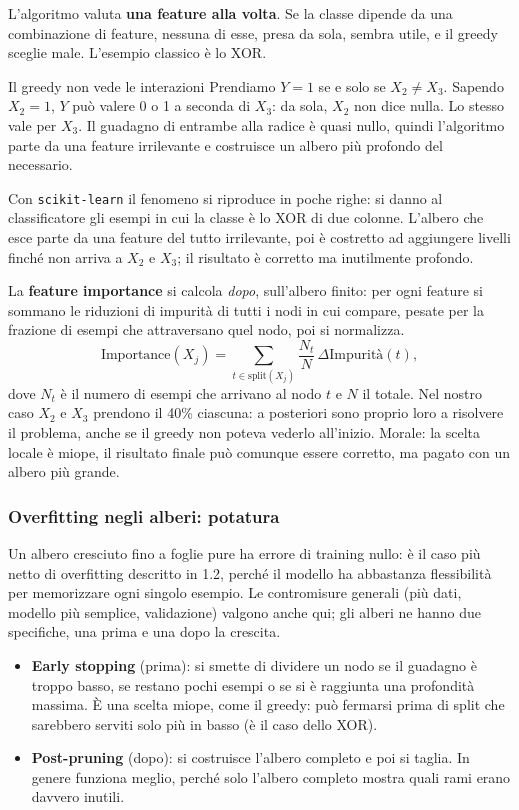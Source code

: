 \documentclass[12pt]{extarticle}
\begin{document}
\noindent L'algoritmo valuta \textbf{una feature alla volta}. Se la classe dipende da una combinazione di feature, nessuna di esse, presa da sola, sembra utile, e il greedy sceglie male. L'esempio classico è lo XOR.

\begin{attenzionebox}{Il greedy non vede le interazioni}
Prendiamo $Y = 1$ se e solo se $X_2 \neq X_3$. Sapendo $X_2=1$, $Y$ può valere 0 o 1 a seconda di $X_3$: da sola, $X_2$ non dice nulla. Lo stesso vale per $X_3$. Il guadagno di entrambe alla radice è quasi nullo, quindi l'algoritmo parte da una feature irrilevante e costruisce un albero più profondo del necessario.
\end{attenzionebox}

\noindent Con \texttt{scikit-learn} il fenomeno si riproduce in poche righe: si danno al classificatore gli esempi in cui la classe è lo XOR di due colonne. L'albero che esce parte da una feature del tutto irrilevante, poi è costretto ad aggiungere livelli finché non arriva a $X_2$ e $X_3$; il risultato è corretto ma inutilmente profondo.

\noindent La \textbf{feature importance} si calcola \emph{dopo}, sull'albero finito: per ogni feature si sommano le riduzioni di impurità di tutti i nodi in cui compare, pesate per la frazione di esempi che attraversano quel nodo, poi si normalizza.
\[
\text{Importance}(X_j) = \sum_{t \in \text{split}(X_j)} \frac{N_t}{N}\,\Delta\text{Impurità}(t),
\]
dove $N_t$ è il numero di esempi che arrivano al nodo $t$ e $N$ il totale. Nel nostro caso $X_2$ e $X_3$ prendono il 40\% ciascuna: a posteriori sono proprio loro a risolvere il problema, anche se il greedy non poteva vederlo all'inizio. Morale: la scelta locale è miope, il risultato finale può comunque essere corretto, ma pagato con un albero più grande.

\subsubsection{Overfitting negli alberi: potatura}

\noindent Un albero cresciuto fino a foglie pure ha errore di training nullo: è il caso più netto di overfitting descritto in 1.2, perché il modello ha abbastanza flessibilità per memorizzare ogni singolo esempio. Le contromisure generali (più dati, modello più semplice, validazione) valgono anche qui; gli alberi ne hanno due specifiche, una prima e una dopo la crescita.
\begin{itemize}
    \item \textbf{Early stopping} (prima): si smette di dividere un nodo se il guadagno è troppo basso, se restano pochi esempi o se si è raggiunta una profondità massima. È una scelta miope, come il greedy: può fermarsi prima di split che sarebbero serviti solo più in basso (è il caso dello XOR).
    \item \textbf{Post-pruning} (dopo): si costruisce l'albero completo e poi si taglia. In genere funziona meglio, perché solo l'albero completo mostra quali rami erano davvero inutili.
\end{itemize}
\end{document}
